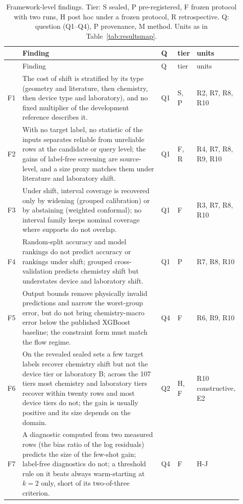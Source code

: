 \documentclass[11pt,a4paper]{article}
\begin{document}
{\scriptsize
\setlength{\tabcolsep}{3pt}
\renewcommand{\arraystretch}{0.92}
\setlength{\LTcapwidth}{\linewidth}
\begin{longtable}{@{}p{0.04\linewidth}p{0.625\linewidth}p{0.075\linewidth}p{0.055\linewidth}p{0.15\linewidth}@{}}
\caption{Framework-level findings. Tier: S sealed, P pre-registered, F frozen
protocol with two runs, H post hoc under a frozen protocol, R retrospective.
Q: question (Q1--Q4), P provenance, M method. Units as in Table~\ref{tab:resultsmap}.}
\label{tab:findings}\\
\toprule
 & Finding & Q & tier & units \\
\midrule
\endfirsthead
\toprule
 & Finding & Q & tier & units \\
\midrule
\endhead
\bottomrule
\endlastfoot
F1 & The cost of shift is stratified by its type (geometry and literature, then chemistry, then device type and laboratory), and no fixed multiplier of the development reference describes it. & Q1 & S, P & R2, R7, R8, R10 \\
F2 & With no target label, no statistic of the inputs separates reliable from unreliable rows at the candidate or query level; the gains of label-free screening are source-level, and a size proxy matches them under literature and laboratory shift. & Q1 & F, R & R4, R7, R8, R9, R10 \\
F3 & Under shift, interval coverage is recovered only by widening (grouped calibration) or by abstaining (weighted conformal); no interval family keeps nominal coverage where supports do not overlap. & Q1 & F & R3, R7, R8, R10 \\
F4 & Random-split accuracy and model rankings do not predict accuracy or rankings under shift; grouped cross-validation predicts chemistry shift but understates device and laboratory shift. & Q1 & P & R7, R8, R10 \\
F5 & Output bounds remove physically invalid predictions and narrow the worst-group error, but do not bring chemistry-macro error below the published XGBoost baseline; the constraint form must match the flow regime. & Q4 & F & R6, R9, R10 \\
F6 & On the revealed sealed sets a few target labels recover chemistry shift but not the device tier or laboratory B; across the 107 tiers most chemistry and laboratory tiers recover within twenty rows and most device tiers do not; the gain is usually positive and its size depends on the domain. & Q2 & H, F & R10 constructive, E2 \\
F7 & A diagnostic computed from two measured rows (the bias ratio of the log residuals) predicts the size of the few-shot gain; label-free diagnostics do not; a threshold rule on it beats always warm-starting at $k = 2$ only, short of its two-of-three criterion. & Q4 & F & H-J \\

\end{longtable}}
\end{document}
